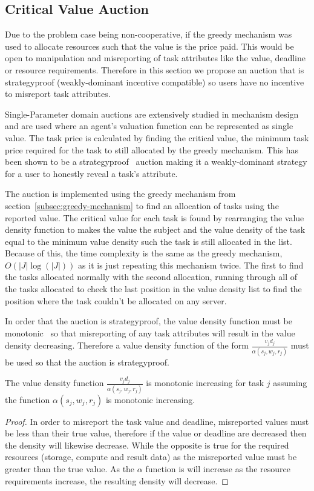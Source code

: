 \subsection{Critical Value Auction}\label{subsec:critical-value-auction}
Due to the problem case being non-cooperative, if the greedy mechanism was used to allocate resources such that the
value is the price paid. This would be open to manipulation and misreporting of task attributes like the value,
deadline or resource requirements. Therefore in this section we propose an auction that is strategyproof
(weakly-dominant incentive compatible) so users have no incentive to misreport task attributes.

Single-Parameter domain auctions are extensively studied in mechanism design~\cite{nisan2007algorithmic_228} and are
used where an agent's valuation function can be represented as single value. The task price is calculated by finding
the critical value, the minimum task price required for the task to still allocated by the greedy mechanism. This has
been shown to be a strategyproof~\cite{nisan2007algorithmic_229_230} auction making it a weakly-dominant strategy for
a user to honestly reveal a task's attribute.

The auction is implemented using the greedy mechanism from section~\ref{subsec:greedy-mechanism} to find an allocation
of tasks using the reported value. The critical value for each task is found by rearranging the value density function
to makes the value the subject and the value density of the task equal to the minimum value density such the task is
still allocated in the list. Because of this, the time complexity is the same as the greedy mechanism,
$O(\left|J\right| \log(\left|J\right|))$ as it is just repeating this mechanism twice. The first to find the tasks
allocated normally with the second allocation, running through all of the tasks allocated to check the last position
in the value density list to find the position where the task couldn't be allocated on any server.

In order that the auction is strategyproof, the value density function must be
monotonic~\cite{nisan2007algorithmic_229_230} so that misreporting of any task attributes will result in the value
density decreasing. Therefore a value density function of the form $\frac{v_j d_j}{\alpha(s_j, w_j, r_j)}$ must be used so
that the auction is strategyproof.
\begin{theorem}
    The value density function $\frac{v_j d_j}{\alpha(s_j, w_j, r_j)}$ is monotonic increasing for task $j$ assuming the
    function $\alpha(s_j, w_j, r_j)$ is monotonic increasing.
\end{theorem}
\begin{proof}
    In order to misreport the task value and deadline, misreported values must be less than their true value, therefore
    if the value or deadline are decreased then the density will likewise decrease.
    While the opposite is true for the required resources (storage, compute and result data) as the misreported value
    must be greater than the true value. As the $\alpha$ function is will increase as the resource requirements increase,
    the resulting density will decrease.
\end{proof}

